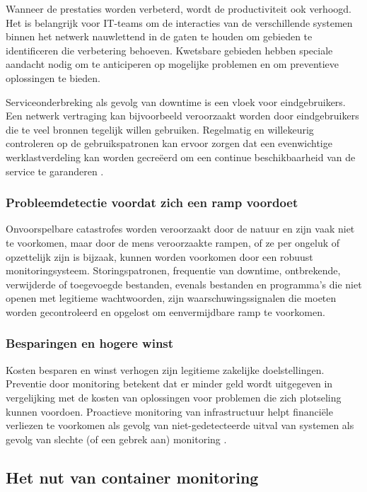 Wanneer de prestaties worden verbeterd, wordt de productiviteit ook verhoogd. Het is belangrijk voor IT-teams om de interacties van de verschillende systemen binnen het netwerk nauwlettend in de gaten te houden om gebieden te identificeren die verbetering behoeven. Kwetsbare gebieden hebben speciale aandacht nodig om te anticiperen op mogelijke problemen en om preventieve oplossingen te bieden.

Serviceonderbreking als gevolg van downtime is een vloek voor eindgebruikers. Een netwerk vertraging kan bijvoorbeeld veroorzaakt worden door eindgebruikers die te veel bronnen tegelijk willen gebruiken. Regelmatig en willekeurig controleren op de gebruikspatronen kan ervoor zorgen dat een evenwichtige werklastverdeling kan worden gecreëerd om een ​​continue beschikbaarheid van de service te garanderen \autocite{Matrix2016}.

\subsubsection{Probleemdetectie voordat zich een ramp voordoet}

Onvoorspelbare catastrofes worden veroorzaakt door de natuur en zijn vaak niet te voorkomen, maar door de mens veroorzaakte rampen, of ze per ongeluk of opzettelijk zijn is bijzaak, kunnen worden voorkomen door een robuust monitoringsysteem. Storingspatronen, frequentie van downtime, ontbrekende, verwijderde of toegevoegde bestanden, evenals bestanden en programma's die niet openen met legitieme wachtwoorden, zijn waarschuwingssignalen die moeten worden gecontroleerd en opgelost om een ​​vermijdbare ramp te voorkomen\autocite{Matrix2016}.

\subsubsection{Besparingen en hogere winst}

Kosten besparen en winst verhogen zijn legitieme zakelijke doelstellingen. Preventie door monitoring betekent dat er minder geld wordt uitgegeven in vergelijking met de kosten van oplossingen voor problemen die zich plotseling kunnen voordoen. Proactieve monitoring van infrastructuur helpt financiële verliezen te voorkomen als gevolg van niet-gedetecteerde uitval van systemen als gevolg van slechte (of een gebrek aan) monitoring \autocite{Matrix2016}. 

\subsection{Het nut van container monitoring}

